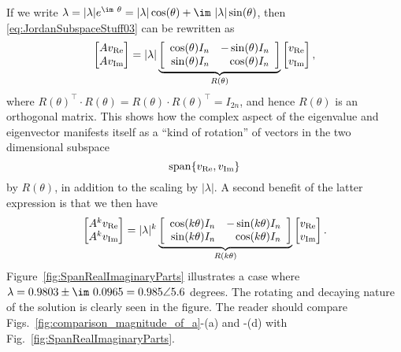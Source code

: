 If we write $\lambda = |\lambda| e^{\im~\theta} = |\lambda| \cos(\theta) + \im ~|\lambda| \sin(\theta) $, then \eqref{eq:JordanSubspaceStuff03} can be rewritten as
\begin{equation}
    \label{eq:JordanSubspaceStuff04}
    \begin{bmatrix}
     A v_{\rm Re}\\ A v_{\rm Im}
    \end{bmatrix} =  |\lambda| \underbrace{\left[ \begin{array}{rr}\cos(\theta) I_n & - \sin(\theta) I_n\\
    \sin(\theta)I_n &  \cos(\theta) I_n\end{array} \right]}_{R(\theta)} \begin{bmatrix}
      v_{\rm Re}\\ v_{\rm Im}
    \end{bmatrix},
\end{equation}
where $R(\theta)^\top \cdot R(\theta)=R(\theta) \cdot R(\theta)^\top = I_{2n}$, and hence $R(\theta)$ is an orthogonal matrix. This shows how the complex aspect of the eigenvalue and eigenvector manifests itself as a ``kind of rotation'' of vectors in the two dimensional subspace 
$$\mathrm{span} \{ v_{\rm Re}, v_{\rm Im} \} $$
by $R(\theta)$, in addition to the scaling by $|\lambda|$. A second benefit of the latter expression is that we then have 
\begin{equation}
    \label{eq:JordanSubspaceStuff05}
     \begin{bmatrix}
     A^k v_{\rm Re}\\ A^k v_{\rm Im}
    \end{bmatrix} =  |\lambda|^k \underbrace{ \left[ \begin{array}{rr}\cos(k \theta) I_n & - \sin (k\theta) I_n\\
    \sin(k \theta)I_n &  \cos(k \theta) I_n\end{array} \right]}_{R(k\theta)} \begin{bmatrix}
      v_{\rm Re}\\ v_{\rm Im}
    \end{bmatrix}.
\end{equation}
Figure~\ref{fig:SpanRealImaginaryParts} illustrates a case where $\lambda=0.9803 \pm \im~ 0.0965= 0.985 \angle 5.6$ degrees. The rotating and decaying nature of the solution is clearly seen in the figure. The reader should compare Figs.~\ref{fig:comparison_magnitude_of_a}-(a) and -(d) with Fig.~\ref{fig:SpanRealImaginaryParts}. 

